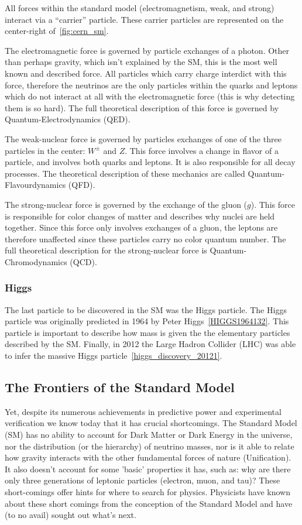 All forces within the standard model (electromagnetism, weak, and strong) interact via a ``carrier'' particle.
These carrier particles are represented on the center-right of~\ref{fig:cern_sm}.

The electromagnetic force is governed by particle exchanges of a photon.
Other than perhaps gravity, which isn't explained by the SM, this is the most well known and described force.
All particles which carry charge interdict with this force, therefore the neutrinos are the only particles within the quarks and leptons which do not interact at all with the electromagnetic force (this is why detecting them is so hard).
The full theoretical description of this force is governed by Quantum-Electrodynamics (QED).

The weak-nuclear force is governed by particles exchanges of one of the three particles in the center: $W^{\pm}$ and $Z$.
This force involves a change in flavor of a particle, and involves both quarks and leptons.
It is also responsible for all decay processes.
The theoretical description of these mechanics are called Quantum-Flavourdynamics (QFD).

The strong-nuclear force is governed by the exchange of the gluon ($g$).
This force is responsible for color changes of matter and describes why nuclei are held together.
Since this force only involves exchanges of a gluon, the leptons are therefore unaffected since these particles carry no color quantum number.
The full theoretical description for the strong-nuclear force is Quantum-Chromodynamics (QCD).

\subsubsection{Higgs}

The last particle to be discovered in the SM was the Higgs particle.
The Higgs particle was originally predicted in 1964 by Peter Higgs~\ref{HIGGS1964132}.
This particle is important to describe how mass is given the the elementary particles described by the SM.
Finally, in 2012 the Large Hadron Collider (LHC) was able to infer the massive Higgs particle~\ref{higgs_discovery_20121}.

\subsection{The Frontiers of the Standard Model}
Yet, despite its numerous achievements in predictive power and experimental verification we know today that it has crucial shortcomings. 
The Standard Model (SM) has no ability to account for Dark Matter or Dark Energy in the universe, nor the distribution (or the hierarchy) of neutrino masses, nor is it able to relate how gravity interacts with the other fundamental forces of nature (Unification).
It also doesn't account for some 'basic' properties it has, such as: why are there only three generations of leptonic particles (electron, muon, and tau)?
These short-comings offer hints for where to search for physics.
Physicists have known about these short comings from the conception of the Standard Model and have (to no avail) sought out what's next.

